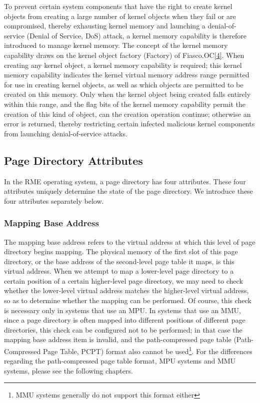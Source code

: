 To prevent certain system components that have the right to create kernel objects from creating a large number of kernel objects when they fail or are compromised, thereby exhausting kernel memory and launching a denial-of-service (Denial
of
Service, DoS) attack, a kernel memory capability is therefore introduced to manage kernel memory. The concept of the kernel memory capability draws on the kernel object factory (Factory) of Fiasco.OC\hyperref[cite:3-4]{{[}4{]}}. When creating any kernel object, a kernel memory capability is required; this kernel memory capability indicates the kernel virtual memory address range permitted for use in creating kernel objects, as well as which objects are permitted to be created on this memory. Only when the kernel object being created falls entirely within this range, and the flag bits of the kernel memory capability permit the creation of this kind of object, can the creation operation continue; otherwise an error is returned, thereby restricting certain infected malicious kernel components from launching denial-of-service attacks.

\subsection{Page Directory Attributes}\label{subsec:3-page-directory-attributes}

In the RME operating system, a page directory has four attributes. These four attributes uniquely determine the state of the page directory. We introduce these four attributes separately below.

\subsubsection{Mapping Base Address}\label{subsubsec:3-mapping-base-address}

The mapping base address refers to the virtual address at which this level of page directory begins mapping. The physical memory of the first slot of this page directory, or the base address of the second-level page table it maps, is this virtual address. When we attempt to map a lower-level page directory to a certain position of a certain higher-level page directory, we may need to check whether the lower-level virtual address matches the higher-level virtual address, so as to determine whether the mapping can be performed. Of course, this check is necessary only in systems that use an MPU. In systems that use an MMU, since a page directory is often mapped into different positions of different page directories, this check can be configured not to be performed; in that case the mapping base address item is invalid, and the path-compressed page table (Path-Compressed
Page
Table, PCPT) format also cannot be used\footnote{MMU systems generally do not support this format either}. For the differences regarding the path-compressed page table format, MPU systems and MMU systems, please see the following chapters.

